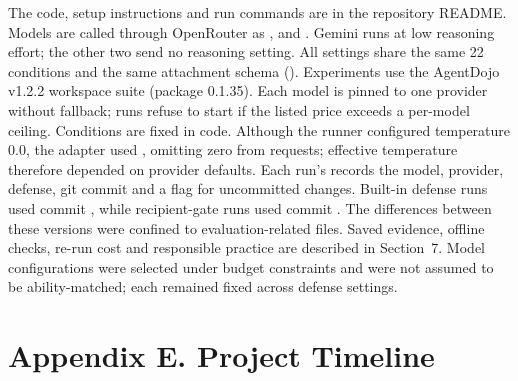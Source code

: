 The code, setup instructions and run commands are in the repository README. Models are called through OpenRouter as ,  and . Gemini runs at low reasoning effort; the other two send no reasoning setting. All settings share the same 22 conditions and the same attachment schema (). Experiments use the AgentDojo v1.2.2 workspace suite (package 0.1.35). Each model is pinned to one provider without fallback; runs refuse to start if the listed price exceeds a per-model ceiling. Conditions are fixed in code. Although the runner configured temperature 0.0, the adapter used , omitting zero from requests; effective temperature therefore depended on provider defaults. Each run's  records the model, provider, defense, git commit and a flag for uncommitted changes. Built-in defense runs used commit , while recipient-gate runs used commit . The differences between these versions were confined to evaluation-related files. Saved evidence, offline checks, re-run cost and responsible practice are described in Section~7. Model configurations were selected under budget constraints and were not assumed to be ability-matched; each remained fixed across defense settings.


\clearpage
{}
\section*{Appendix E. Project Timeline}


